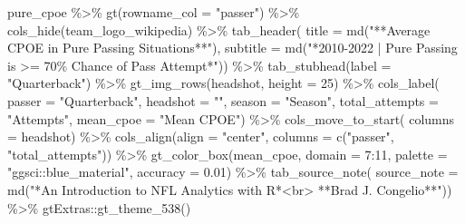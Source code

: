 \documentclass[
  letterpaper,
]{krantz}
\newenvironment{Shaded}{\begin{snugshade}}{\end{snugshade}}
\newcommand{\AttributeTok}[1]{\textcolor[rgb]{0.40,0.45,0.13}{#1}}
\newcommand{\DecValTok}[1]{\textcolor[rgb]{0.68,0.00,0.00}{#1}}
\newcommand{\FloatTok}[1]{\textcolor[rgb]{0.68,0.00,0.00}{#1}}
\newcommand{\FunctionTok}[1]{\textcolor[rgb]{0.28,0.35,0.67}{#1}}
\newcommand{\NormalTok}[1]{\textcolor[rgb]{0.00,0.23,0.31}{#1}}
\newcommand{\SpecialCharTok}[1]{\textcolor[rgb]{0.37,0.37,0.37}{#1}}
\newcommand{\StringTok}[1]{\textcolor[rgb]{0.13,0.47,0.30}{#1}}
\begin{document}
\begin{Shaded}
\begin{Highlighting}[]
\NormalTok{pure\_cpoe }\SpecialCharTok{\%\textgreater{}\%}
  \FunctionTok{gt}\NormalTok{(}\AttributeTok{rowname\_col =} \StringTok{"passer"}\NormalTok{) }\SpecialCharTok{\%\textgreater{}\%}
  \FunctionTok{cols\_hide}\NormalTok{(team\_logo\_wikipedia) }\SpecialCharTok{\%\textgreater{}\%}
  \FunctionTok{tab\_header}\NormalTok{(}
    \AttributeTok{title =} \FunctionTok{md}\NormalTok{(}\StringTok{"**Average CPOE in Pure Passing Situations**"}\NormalTok{),}
    \AttributeTok{subtitle =} \FunctionTok{md}\NormalTok{(}\StringTok{"*2010{-}2022  |  Pure Passing is \textgreater{}= 70\%}
\StringTok{                  Chance of Pass Attempt*"}\NormalTok{)) }\SpecialCharTok{\%\textgreater{}\%}
  \FunctionTok{tab\_stubhead}\NormalTok{(}\AttributeTok{label =} \StringTok{"Quarterback"}\NormalTok{) }\SpecialCharTok{\%\textgreater{}\%}
  \FunctionTok{gt\_img\_rows}\NormalTok{(headshot, }\AttributeTok{height =} \DecValTok{25}\NormalTok{) }\SpecialCharTok{\%\textgreater{}\%}
  \FunctionTok{cols\_label}\NormalTok{(}
    \AttributeTok{passer =} \StringTok{"Quarterback"}\NormalTok{,}
    \AttributeTok{headshot =} \StringTok{""}\NormalTok{,}
    \AttributeTok{season =} \StringTok{"Season"}\NormalTok{,}
    \AttributeTok{total\_attempts =} \StringTok{"Attempts"}\NormalTok{,}
    \AttributeTok{mean\_cpoe =} \StringTok{"Mean CPOE"}\NormalTok{) }\SpecialCharTok{\%\textgreater{}\%}
  \FunctionTok{cols\_move\_to\_start}\NormalTok{(}
    \AttributeTok{columns =}\NormalTok{ headshot) }\SpecialCharTok{\%\textgreater{}\%}
  \FunctionTok{cols\_align}\NormalTok{(}\AttributeTok{align =} \StringTok{"center"}\NormalTok{, }\AttributeTok{columns =} \FunctionTok{c}\NormalTok{(}\StringTok{"passer"}\NormalTok{, }\StringTok{"total\_attempts"}\NormalTok{)) }\SpecialCharTok{\%\textgreater{}\%}
  \FunctionTok{gt\_color\_box}\NormalTok{(mean\_cpoe, }\AttributeTok{domain =} \DecValTok{7}\SpecialCharTok{:}\DecValTok{11}\NormalTok{,}
               \AttributeTok{palette =} \StringTok{"ggsci::blue\_material"}\NormalTok{, }\AttributeTok{accuracy =} \FloatTok{0.01}\NormalTok{) }\SpecialCharTok{\%\textgreater{}\%}
  \FunctionTok{tab\_source\_note}\NormalTok{(}
    \AttributeTok{source\_note =} \FunctionTok{md}\NormalTok{(}\StringTok{"*An Introduction to NFL Analytics with R*\textless{}br\textgreater{}}
\StringTok{                     **Brad J. Congelio**"}\NormalTok{)) }\SpecialCharTok{\%\textgreater{}\%}
\NormalTok{  gtExtras}\SpecialCharTok{::}\FunctionTok{gt\_theme\_538}\NormalTok{()}
\end{Highlighting}
\end{Shaded}
\end{document}
